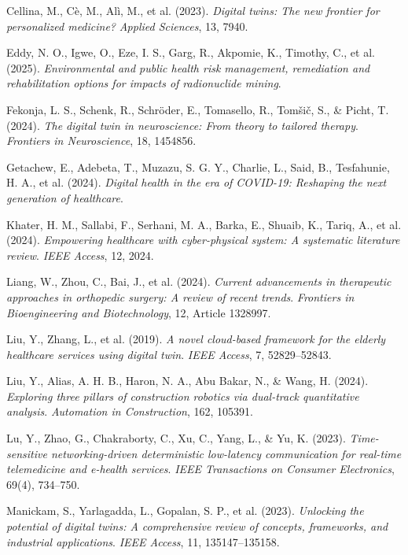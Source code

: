 \documentclass[10pt,a4paper]{article}
\begin{document}
\begin{thebibliography}{99}
Cellina, M., Cè, M., Alì, M., et al. (2023).  
\textit{Digital twins: The new frontier for personalized medicine?}  
\textit{Applied Sciences}, 13, 7940.

Eddy, N. O., Igwe, O., Eze, I. S., Garg, R., Akpomie, K., Timothy, C., et al. (2025).  
\textit{Environmental and public health risk management, remediation and rehabilitation options for impacts of radionuclide mining}.

Fekonja, L. S., Schenk, R., Schröder, E., Tomasello, R., Tomšič, S., \& Picht, T. (2024).  
\textit{The digital twin in neuroscience: From theory to tailored therapy}.  
\textit{Frontiers in Neuroscience}, 18, 1454856.

Getachew, E., Adebeta, T., Muzazu, S. G. Y., Charlie, L., Said, B., Tesfahunie, H. A., et al. (2024).  
\textit{Digital health in the era of COVID-19: Reshaping the next generation of healthcare}.

Khater, H. M., Sallabi, F., Serhani, M. A., Barka, E., Shuaib, K., Tariq, A., et al. (2024).  
\textit{Empowering healthcare with cyber-physical system: A systematic literature review}.  
\textit{IEEE Access}, 12, 2024.

Liang, W., Zhou, C., Bai, J., et al. (2024).  
\textit{Current advancements in therapeutic approaches in orthopedic surgery: A review of recent trends}.  
\textit{Frontiers in Bioengineering and Biotechnology}, 12, Article 1328997.

Liu, Y., Zhang, L., et al. (2019).  
\textit{A novel cloud-based framework for the elderly healthcare services using digital twin}.  
\textit{IEEE Access}, 7, 52829--52843.

Liu, Y., Alias, A. H. B., Haron, N. A., Abu Bakar, N., \& Wang, H. (2024).  
\textit{Exploring three pillars of construction robotics via dual-track quantitative analysis}.  
\textit{Automation in Construction}, 162, 105391.

Lu, Y., Zhao, G., Chakraborty, C., Xu, C., Yang, L., \& Yu, K. (2023).  
\textit{Time-sensitive networking-driven deterministic low-latency communication for real-time telemedicine and e-health services}.  
\textit{IEEE Transactions on Consumer Electronics}, 69(4), 734--750.

Manickam, S., Yarlagadda, L., Gopalan, S. P., et al. (2023).  
\textit{Unlocking the potential of digital twins: A comprehensive review of concepts, frameworks, and industrial applications}.  
\textit{IEEE Access}, 11, 135147--135158.


\end{thebibliography}
\end{document}
